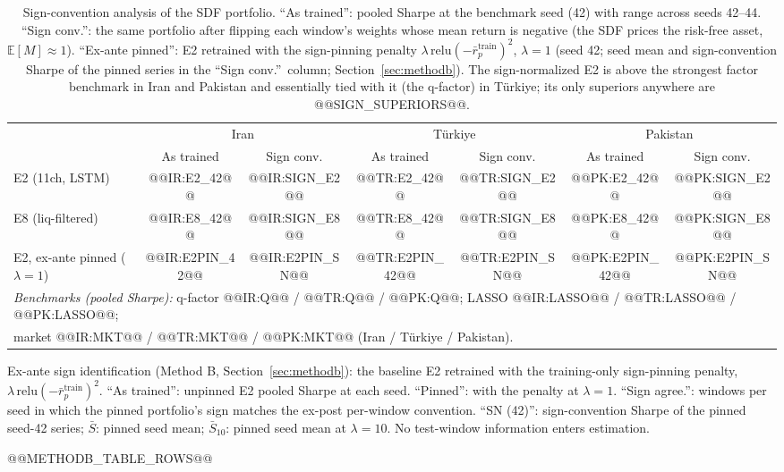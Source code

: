 \documentclass[12pt]{article}
\begin{document}
\begin{table}[htbp]
\centering
\small
\caption{Sign-convention analysis of the SDF portfolio. ``As trained'': pooled Sharpe at the benchmark seed (42) with range across seeds 42--44. ``Sign conv.'': the same portfolio after flipping each window's weights whose mean return is negative (the SDF prices the risk-free asset, $\mathbb{E}[M]\approx 1$). ``Ex-ante pinned'': E2 retrained with the sign-pinning penalty $\lambda\,\mathrm{relu}(-\bar r^{\mathrm{train}}_p)^2$, $\lambda{=}1$ (seed 42; seed mean and sign-convention Sharpe of the pinned series in the ``Sign conv.''\ column; Section~\ref{sec:methodb}). The sign-normalized E2 is above the strongest factor benchmark in Iran and Pakistan and essentially tied with it (the q-factor) in T\"urkiye; its only superiors anywhere are @@SIGN_SUPERIORS@@.}
\label{tab:sign}
\footnotesize
\begin{tabular}{l cc cc cc}
\toprule
 & \multicolumn{2}{c}{Iran} & \multicolumn{2}{c}{T\"urkiye} & \multicolumn{2}{c}{Pakistan} \\
\cmidrule(lr){2-3}\cmidrule(lr){4-5}\cmidrule(lr){6-7}
 & As trained & Sign conv. & As trained & Sign conv. & As trained & Sign conv. \\
\midrule
E2 (11ch, LSTM) & @@IR:E2_42@@ & @@IR:SIGN_E2@@ & @@TR:E2_42@@ & @@TR:SIGN_E2@@ & @@PK:E2_42@@ & @@PK:SIGN_E2@@ \\
E8 (liq-filtered) & @@IR:E8_42@@ & @@IR:SIGN_E8@@ & @@TR:E8_42@@ & @@TR:SIGN_E8@@ & @@PK:E8_42@@ & @@PK:SIGN_E8@@ \\
E2, ex-ante pinned ($\lambda{=}1$) & @@IR:E2PIN_42@@ & @@IR:E2PIN_SN@@ & @@TR:E2PIN_42@@ & @@TR:E2PIN_SN@@ & @@PK:E2PIN_42@@ & @@PK:E2PIN_SN@@ \\
\midrule
\multicolumn{7}{l}{\emph{Benchmarks (pooled Sharpe):} q-factor @@IR:Q@@ / @@TR:Q@@ / @@PK:Q@@; LASSO @@IR:LASSO@@ / @@TR:LASSO@@ / @@PK:LASSO@@;} \\
\multicolumn{7}{l}{market @@IR:MKT@@ / @@TR:MKT@@ / @@PK:MKT@@ (Iran / T\"urkiye / Pakistan).} \\
\bottomrule
\end{tabular}
\end{table}

\begin{table}[htbp]
\centering
\small
\caption{Ex-ante sign identification (Method B, Section~\ref{sec:methodb}): the baseline E2 retrained with the training-only sign-pinning penalty, $\lambda\,\mathrm{relu}(-\bar r^{\mathrm{train}}_p)^2$. ``As trained'': unpinned E2 pooled Sharpe at each seed. ``Pinned'': with the penalty at $\lambda{=}1$. ``Sign agree.'': windows per seed in which the pinned portfolio's sign matches the ex-post per-window convention. ``SN (42)'': sign-convention Sharpe of the pinned seed-42 series; $\bar{S}$: pinned seed mean; $\bar{S}_{10}$: pinned seed mean at $\lambda{=}10$. No test-window information enters estimation.}
\label{tab:methodb}
\footnotesize
\setlength{\tabcolsep}{3pt}%
@@METHODB_TABLE_ROWS@@
\end{table}
\end{document}
